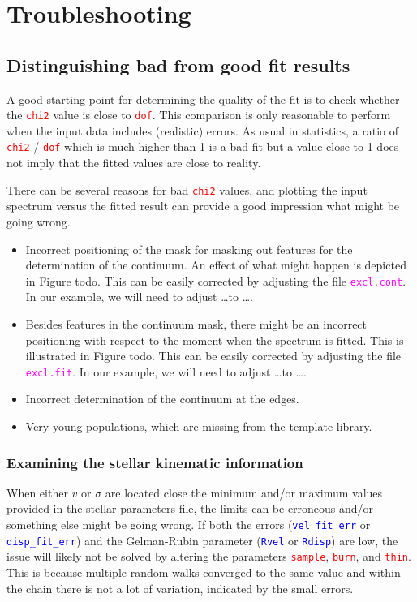 \documentclass[usenatbib,usegraphicx,useAMS,onecolumn]{mn2e}
\newcommand{\codeline}[1]{\lstinline|#1|}
\newcommand{\paramdef}[1]{\textcolor{red}{\codeline{#1}}}
\newcommand{\tblcol}[1]{\textcolor{blue}{\codeline{#1}}}
\newcommand{\fname}[1]{\textcolor{magenta}{\codeline{#1}}}
\begin{document}
\section{Troubleshooting}
\label{sec:trouble}
\subsection{Distinguishing bad from good fit results}
\label{subsec:guidelines_bad_vs_good}
A good starting point for determining the quality of the fit is to check whether the \paramdef{chi2} value is close to \paramdef{dof}.
This comparison is only reasonable to perform when the input data includes (realistic) errors.
As usual in statistics, a ratio of \paramdef{chi2} / \paramdef{dof} which is much higher than 1 is a bad fit but a value close to 1 does not imply that the fitted values are close to reality.

There can be several reasons for bad \paramdef{chi2} values, and plotting the input spectrum versus the fitted result can provide a good impression what might be going wrong.
\begin{itemize}
    \item Incorrect positioning of the mask for masking out features for the determination of the continuum.
        An effect of what might happen is depicted in Figure todo.
        This can be easily corrected by adjusting the file \fname{excl.cont}.
        In our example, we will need to adjust \ldots to \ldots.
    \item Besides features in the continuum mask, there might be an incorrect positioning with respect to the moment when the spectrum is fitted.
        This is illustrated in Figure todo.
        This can be easily corrected by adjusting the file \fname{excl.fit}.
        In our example, we will need to adjust \ldots to \ldots.
    \item Incorrect determination of the continuum at the edges.
    \item Very young populations, which are missing from the template library.
\end{itemize}

\subsubsection{Examining the stellar kinematic information}
When either $v$ or $\sigma$ are located close the minimum and/or maximum values provided in the stellar parameters file, the limits can be erroneous and/or something else might be going wrong.
If both the errors (\tblcol{vel_fit_err} or \tblcol{disp_fit_err}) and the Gelman-Rubin parameter (\tblcol{Rvel} or \tblcol{Rdisp}) are low, the issue will likely not be solved by altering the parameters \paramdef{sample}, \paramdef{burn}, and \paramdef{thin}.
This is because multiple random walks converged to the same value and within the chain there is not a lot of variation, indicated by the small errors.
\end{document}
